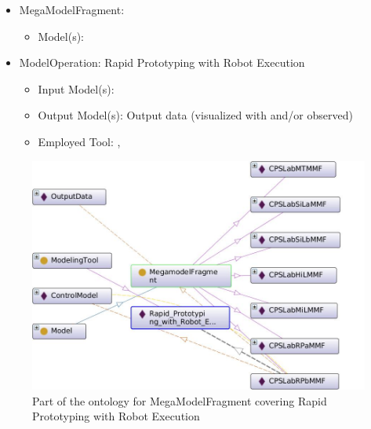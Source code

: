 
\begin{itemize}
    \item MegaModelFragment: \CPSLabRPbMMF
    \begin{itemize}
        \item Model(s): \CPSLabControlModel
    \end{itemize}
\end{itemize}


\begin{itemize}
    \item ModelOperation: Rapid Prototyping with Robot Execution
    \begin{itemize}
        \item Input Model(s): \CPSLabControlModel
        \item Output Model(s): Output data (visualized with \MATLABSimulinkSimulator and/or observed)
        \item Employed Tool: \MATLABSimulinkSimulator, \RobotExecutionRemote {}
    \end{itemize}
\end{itemize}


\begin{figure}[!htb]
\centering
\includegraphics[scale=0.333]{figures/CPSLabRPbMMF.jpg}
\caption{Part of the ontology for MegaModelFragment \CPSLabRPbMMF covering Rapid Prototyping with Robot Execution}
\label{fig:CPSLabRPbMMF}
\end{figure}


